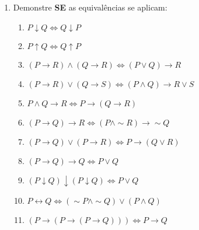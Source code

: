 \documentclass[12pt, a4paper,final]{article}
\begin{document}
    \begin{enumerate}
        \item Demonstre \textbf{SE} as equivalências se aplicam:
        
        \begin{enumerate}[label=(\alph*)]
        
            \item $P \downarrow Q \Leftrightarrow Q \downarrow P$ %
            
            \item $P \uparrow Q \Leftrightarrow Q \uparrow P$ %
            
            \item $(P \rightarrow R) \wedge (Q \rightarrow R) \Leftrightarrow (P \vee Q) \rightarrow R$ %
            
            \item $(P \rightarrow R) \vee (Q \rightarrow S) \Leftrightarrow (P \wedge Q) \rightarrow R \vee S$ %
            
            \item $P \wedge Q \rightarrow R \Leftrightarrow P \rightarrow (Q \rightarrow R)$ %
            
            \item $(P \rightarrow Q) \rightarrow R \Leftrightarrow (P \wedge \sim R) \rightarrow \sim Q $ %
            
            \item $(P \rightarrow Q) \vee (P \rightarrow R) \Leftrightarrow P \rightarrow (Q \vee R)$ %

            \item $(P \rightarrow Q) \rightarrow Q \Leftrightarrow P \vee Q $ %
            
            \item $(P \downarrow Q) \downarrow (P \downarrow Q) \Leftrightarrow P \vee Q$ %
            
            \item $P \leftrightarrow Q \Leftrightarrow (\sim P \wedge \sim Q) \vee (P \wedge Q)$ %
            
            \item $(P \rightarrow(P \rightarrow(P \rightarrow Q))) \Leftrightarrow P \rightarrow Q$ %
            

\end{enumerate}
\end{enumerate}
\end{document}
